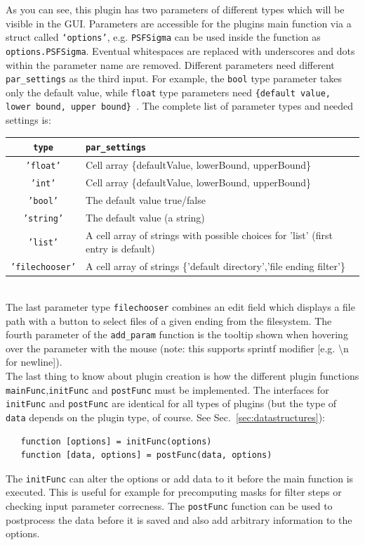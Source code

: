 \documentclass[11pt,onside]{report}
\numberwithin{equation}{chapter}
\begin{document}
As you can see, this plugin has two parameters of different types which will be visible in the GUI. Parameters are accessible for the plugins main function via a struct called \texttt{`options'}, e.g. \texttt{PSFSigma} can be used inside the function as \texttt{options.PSFSigma}. Eventual whitespaces are replaced with underscores and dots within the parameter name are removed. Different parameters need different \texttt{par\_settings} as the third input. For example, the \texttt{bool} type parameter takes only the default value, while \texttt{float} type parameters need \texttt{\{default value, lower bound, upper bound\} }. The complete list of parameter types and needed settings is: \\

\begin{tabular}{cl}
\toprule \texttt{type} & \texttt{par\_settings} \\ \midrule
  \texttt{'float'}  &Cell array \{defaultValue, lowerBound, upperBound\}\\
   \texttt{'int'}    &Cell array \{defaultValue, lowerBound, upperBound\}\\
   \texttt{'bool'}   &The default value true/false\\
   \texttt{'string'} & The default value (a string)\\
   \texttt{'list'}  & A cell array of strings with possible choices for 'list' (first entry is default)\\
   \texttt{'filechooser'} &A cell array of strings \{'default directory','file ending filter'\}\\
   \bottomrule
\end{tabular} \\

The last parameter type \texttt{filechooser} combines an edit field which displays a file path with a button to select files of a given ending from the filesystem. The fourth parameter of the \texttt{add\_param} function is the tooltip shown when hovering over the parameter with the mouse (note: this supports sprintf modifier [e.g. \textbackslash{}n for newline]). \\

The last thing to know about plugin creation is how the different plugin functions \texttt{mainFunc},\texttt{initFunc} and \texttt{postFunc} must be implemented. The interfaces for \texttt{initFunc} and \texttt{postFunc} are identical for all types of plugins (but the type of \texttt{data} depends on the plugin type, of course. See Sec.~\ref{sec:datastructures}):
\begin{verbatim}
   function [options] = initFunc(options)
   function [data, options] = postFunc(data, options)
\end{verbatim}
The \texttt{initFunc} can alter the options or add data to it before the main function is executed. This is useful for example for precomputing masks for filter steps or checking input parameter correcness. The \texttt{postFunc} function can be used to postprocess the data before it is saved and also add arbitrary information to the options.\\
\end{document}
